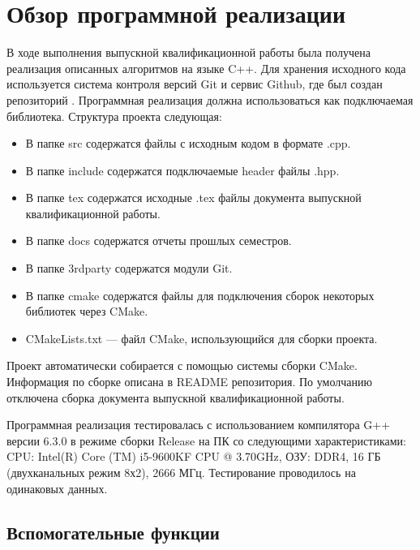 \newpage

\section{Обзор программной реализации}

В ходе выполнения выпускной квалификационной работы была получена реализация описанных алгоритмов на языке C++. Для хранения исходного кода используется система контроля версий Git и сервис Github, где был создан репозиторий \cite{Repository}. Программная реализация должна использоваться как подключаемая библиотека. Структура проекта следующая:
\begin{itemize}

\item В папке src содержатся файлы с исходным кодом в формате .cpp.

\item В папке include содержатся подключаемые header файлы .hpp.

\item В папке tex содержатся исходные .tex файлы документа выпускной квалификационной работы.

\item В папке docs содержатся отчеты прошлых семестров.

\item В папке 3rdparty содержатся модули Git.

\item В папке cmake содержатся файлы для подключения сборок некоторых библиотек через CMake.

\item CMakeLists.txt --- файл CMake, использующийся для сборки проекта.

\end{itemize}

Проект автоматически собирается с помощью системы сборки CMake. Информация по сборке описана в README репозитория. По умолчанию отключена сборка документа выпускной квалификационной работы.

Программная реализация тестировалась с использованием компилятора G++ версии 6.3.0 в режиме сборки Release на ПК со следующими характеристиками: CPU: Intel(R) Core (TM) i5-9600KF CPU @ 3.70GHz, ОЗУ: DDR4, 16 ГБ (двухканальных режим 8х2), 2666 МГц. Тестирование проводилось на одинаковых данных.

\subsection{Вспомогательные функции}

